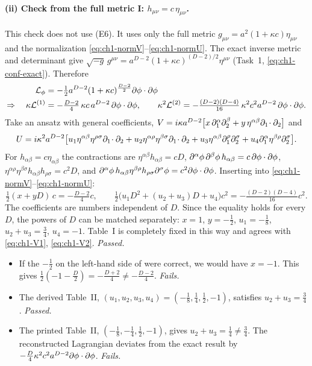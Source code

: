 \paragraph{(ii) Check from the full metric I: $h_{\mu\nu}=c\,\eta_{\mu\nu}$.}
This check does not use (E6). It uses only the full metric
$g_{\mu\nu}=a^2(1+\kappa c)\eta_{\mu\nu}$ and the normalization
\eqref{eq:ch1-normV}--\eqref{eq:ch1-normU}. The exact inverse metric and
determinant give
$\sqrt{-g}\,g^{\mu\nu}=a^{D-2}(1+\kappa c)^{(D-2)/2}\eta^{\mu\nu}$
(Task~1, \eqref{eq:ch1-conf-exact}). Therefore
\begin{equation}
\begin{aligned}\mathcal L_\phi&=-\tfrac12a^{D-2}(1+\kappa c)^{\frac{D-2}2}\partial\phi\cdot\partial\phi\\
\Rightarrow\quad \kappa\mathcal L^{(1)}&=-\tfrac{D-2}{4}\,\kappa c\,a^{D-2}\,\partial\phi\cdot\partial\phi,\qquad
\kappa^2\mathcal L^{(2)}=-\tfrac{(D-2)(D-4)}{16}\,\kappa^2c^2a^{D-2}\,\partial\phi\cdot\partial\phi .\end{aligned}
\label{eq:ch1-conf-L}
\end{equation}
Take an ansatz with general coefficients,
$V=i\kappa a^{D-2}\big[x\,\partial_1^\alpha\partial_2^\beta+y\,\eta^{\alpha\beta}\partial_1\!\cdot\partial_2\big]$
and
\begin{equation*}
U=i\kappa^2a^{D-2}\big[u_1\eta^{\alpha\beta}\eta^{\rho\sigma}\partial_1\!\cdot\partial_2+u_2\eta^{\alpha\rho}\eta^{\beta\sigma}\partial_1\!\cdot\partial_2+u_3\eta^{\alpha\beta}\partial_1^\rho\partial_2^\sigma+u_4\partial_1^\alpha\eta^{\beta\rho}\partial_2^\sigma\big].
\end{equation*}
For $h_{\alpha\beta}=c\eta_{\alpha\beta}$ the contractions are
$\eta^{\alpha\beta}h_{\alpha\beta}=cD$,
$\partial^\alpha\phi\,\partial^\beta\phi\,h_{\alpha\beta}=c\,\partial\phi\cdot\partial\phi$,
$\eta^{\alpha\rho}\eta^{\beta\sigma}h_{\alpha\beta}h_{\rho\sigma}=c^2D$, and
$\partial^\alpha\phi\,h_{\alpha\beta}\eta^{\beta\rho}h_{\rho\sigma}\partial^\sigma\phi=c^2\partial\phi\cdot\partial\phi$.
Inserting into \eqref{eq:ch1-normV}--\eqref{eq:ch1-normU}:
\begin{equation}
\tfrac12(x+yD)\,c=-\tfrac{D-2}4c,\qquad \tfrac12\big(u_1D^2+(u_2+u_3)D+u_4\big)c^2=-\tfrac{(D-2)(D-4)}{16}c^2 .
\label{eq:ch1-conf-sys}
\end{equation}
The coefficients are numbers independent of $D$. Since the equality holds for
every $D$, the powers of $D$ can be matched separately: $x=1$, $y=-\tfrac12$,
$u_1=-\tfrac18$, $u_2+u_3=\tfrac34$, $u_4=-1$. Table~I is completely fixed in
this way and agrees with \eqref{eq:ch1-V1}, \eqref{eq:ch1-V2}. \emph{Passed.}
\begin{itemize}[leftmargin=1.4em]
\item If the $-\tfrac12$ on the left-hand side of  were correct, we would
have $x=-1$. This gives $\tfrac12(-1-\tfrac D2)=-\tfrac{D+2}4\neq-\tfrac{D-2}4$.
\emph{Fails.}
\item The derived Table~II, $(u_1,u_2,u_3,u_4)=(-\tfrac18,\tfrac14,\tfrac12,-1)$,
satisfies $u_2+u_3=\tfrac34$. \emph{Passed.}
\item The printed Table~II, $(-\tfrac18,-\tfrac14,\tfrac12,-1)$, gives
$u_2+u_3=\tfrac14\neq\tfrac34$. The reconstructed Lagrangian deviates from the
exact result by $-\tfrac D4\kappa^2c^2a^{D-2}\partial\phi\cdot\partial\phi$. \emph{Fails.}
\end{itemize}

